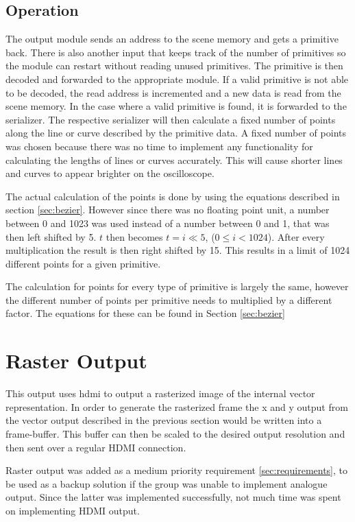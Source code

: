 \subsection{Operation}

The output module sends an address to the scene memory and gets a primitive back.
There is also another input that keeps track of the number of primitives so the module can restart without reading unused primitives.
The primitive is then decoded and forwarded to the appropriate module.
If a valid primitive is not able to be decoded, the read address is incremented and a new data is read from the scene memory.
In the case where a valid primitive is found, it is forwarded to the serializer.
The respective serializer will then calculate a fixed number of points along the line or curve described by the primitive data.
A fixed number of points was chosen because there was no time to implement any functionality for calculating the lengths of lines or curves accurately.
This will cause shorter lines and curves to appear brighter on the oscilloscope.

The actual calculation of the points is done by using the equations described in section \ref{sec:bezier}.
However since there was no floating point unit, a number between 0 and 1023 was used instead of a number between 0 and 1, that was then left shifted by 5.
\(t\) then becomes \(t = i \ll 5\), (\(0 \leq i < 1024\)).
After every multiplication the result is then right shifted by 15.
This results in a limit of 1024 different points for a given primitive.

The calculation for points for every type of primitive is largely the same, however the different number of points per primitive needs to multiplied by a different factor.
The equations for these can be found in Section \ref{sec:bezier}

\section{Raster Output}

This output uses \gls{hdmi} to output a rasterized image of the internal vector representation.
In order to generate the rasterized frame the x and y output from the vector output described in the previous section would be written into a frame-buffer.
This buffer can then be scaled to the desired output resolution and then sent over a regular HDMI connection.

Raster output was added as a medium priority requirement \ref{sec:requirements}, to be used as a backup solution if the group was unable to implement analogue output.
Since the latter was implemented successfully, not much time was spent on implementing HDMI output.
